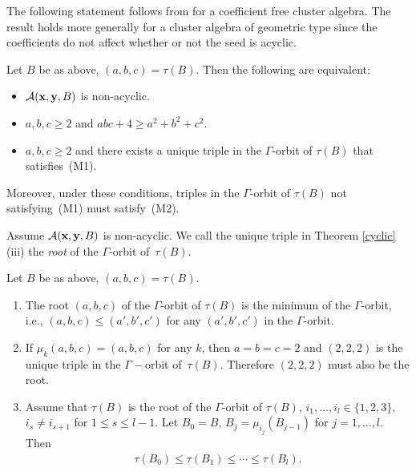 The following statement follows from \cite[Theorem~1.2, Lemma~2.1]{BBH} for a coef\/f\/icient free cluster algebra. The result holds more generally for a cluster algebra of geometric type since the coef\/f\/icients do not af\/fect whether or not the seed is acyclic.
\begin{Theorem}
\label{cyclic}
Let $B$ be as above, $(a,b,c)=\tau(B)$. Then the following are equivalent:
\begin{itemize}\itemsep=0pt
\item[\rm(i)]$\mathcal{A}({\bf x},{\bf y},B)$ is non-acyclic.

\item[\rm(ii)] $a,b,c \geq 2$ and $abc+4\ge a^2+b^2+c^2$.

\item[\rm(iii)] $a,b,c\ge 2$ and there exists a unique triple in the $\Gamma$-orbit of $\tau(B)$ that satisfies~{\rm(M1)}.
\end{itemize}
Moreover, under these conditions, triples in the $\Gamma$-orbit of $\tau(B)$ not satisfying~{\rm(M1)} must sa\-tis\-fy~{\rm(M2)}.
\end{Theorem}

Assume $\mathcal{A}({\bf x},{\bf y},B)$ is non-acyclic. We call the unique triple in Theorem \ref{cyclic}(iii) the \emph{root} of the $\Gamma$-orbit of~$\tau(B)$.


\begin{Lemma}\label{lemma:chain inequality}
Let $B$ be as above, $(a,b,c)=\tau(B)$.
\begin{enumerate}\itemsep=0pt
\item[$(i)$] The root $(a,b,c)$ of the $\Gamma$-orbit of $\tau(B)$ is the minimum of the $\Gamma$-orbit, i.e., $(a,b,c)\le(a',b',c')$ for any $(a',b',c')$ in the $\Gamma$-orbit.

\item[$(ii)$] If $\mu_k(a,b,c)=(a,b,c)$ for any $k$, then $a=b=c=2$ and $(2,2,2)$ is the unique triple in the $\Gamma-$orbit of~$\tau(B)$. Therefore $(2,2,2)$ must also be the root.

\item[$(iii)$] Assume that $\tau(B)$ is the root of the $\Gamma$-orbit of $\tau(B)$,  $i_1,\dots,i_l\in\{1,2,3\}$, $i_s\neq i_{s+1}$ for $1\le s\le l-1$.
Let $B_0=B$, $B_j=\mu_{i_j}(B_{j-1})$ for $j=1,\dots,l$. Then
\begin{gather*}\tau(B_0)\le\tau(B_1)\le\cdots\le\tau(B_l).
\end{gather*}
\end{enumerate}
\end{Lemma}

